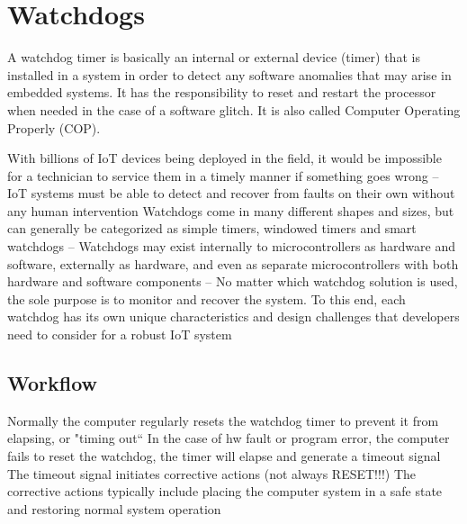 \section{Watchdogs}

A watchdog timer is basically an internal or external device (timer) that is installed in a system in order to detect any software anomalies that may arise in embedded systems.
It has the responsibility to reset and restart the processor when needed in the case of a software glitch.
It is also called Computer Operating Properly (COP).

With billions of IoT devices being deployed in the field, it
would be impossible for a technician to service them in a
timely manner if something goes wrong
– IoT systems must be able to detect and recover from faults on their
own without any human intervention
 Watchdogs come in many different shapes and sizes, but
can generally be categorized as simple timers, windowed
timers and smart watchdogs
– Watchdogs may exist internally to microcontrollers as hardware and
software, externally as hardware, and even as separate
microcontrollers with both hardware and software components
– No matter which watchdog solution is used, the sole purpose is to
monitor and recover the system. To this end, each watchdog has its
own unique characteristics and design challenges that developers
need to consider for a robust IoT system

\subsection{Workflow}
Normally the computer regularly resets the watchdog timer to prevent it from elapsing, or "timing out“
In the case of hw fault or program error, the computer fails to reset the watchdog, the timer will elapse and generate a timeout signal
The timeout signal initiates corrective actions (not always RESET!!!)
The corrective actions typically include placing the computer system in a safe state and restoring normal system operation

